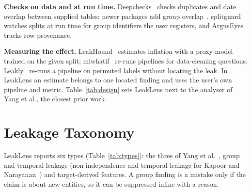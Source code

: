 \documentclass[conference]{IEEEtran}
\newcommand{\tool}{LeakLens}
\begin{document}
\textbf{Checks on data and at run time.} Deepchecks~\cite{chorev2022} checks duplicates and date overlap between
supplied tables; newer packages add group overlap~\cite{leakcheckml,leakhound,dataleaks}. splitguard~\cite{splitguard}
watches splits at run time for group identifiers the user registers, and ArgusEyes~\cite{schelter2023} tracks row
provenance.

\textbf{Measuring the effect.} LeakHound~\cite{leakhound} estimates inflation with a proxy model trained on the
given split; mlwhatif~\cite{grafberger2023} re-runs pipelines for data-cleaning questions; Leakly~\cite{leakly}
re-runs a pipeline on permuted labels without locating the leak. In \tool{} an estimate
belongs to one located finding and uses the user's own pipeline and metric. Table~\ref{tab:design} sets \tool{}
next to the analyser of Yang et al., the closest prior work.

\begin{table}[t]
\caption{Design comparison between the static analyser of Yang et al.\ and \tool{}. Entries for Yang et al.\
come from their paper and our runs of their released tool. The two accuracy rows were measured on different data
with different labelling and are not comparable; Table~\ref{tab:yang} is the like-for-like measurement.}
\label{tab:design}
\scriptsize

\end{table}

\section{Leakage Taxonomy}

\tool{} reports six types (Table~\ref{tab:types}): the three of Yang et al.~\cite{yang2022}, group and temporal
leakage (non-independence and temporal leakage for Kapoor and Narayanan~\cite{kapoor2023}) and target-derived
features. A group finding is a mistake only if the claim is about new entities, so it
can be suppressed inline with a reason.
\end{document}

